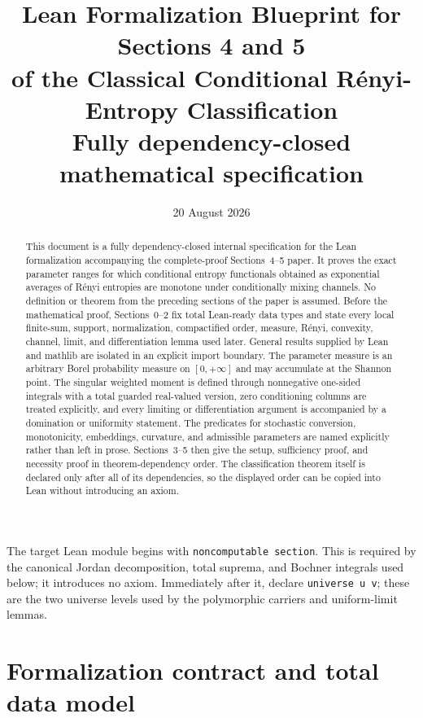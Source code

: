 \documentclass[9pt]{extarticle}
\title{Lean Formalization Blueprint for Sections 4 and 5\\
of the Classical Conditional R\'enyi-Entropy Classification\\
\large Fully dependency-closed mathematical specification}
\author{}
\date{20 August 2026}
\theoremstyle{definition}
\theoremstyle{remark}
\begin{document}
\maketitle

\begin{abstract}
This document is a fully dependency-closed internal specification for the Lean
formalization accompanying the complete-proof Sections~4--5 paper.  It proves the exact parameter
ranges for which conditional entropy functionals obtained as exponential
averages of R\'enyi entropies are monotone under conditionally mixing
channels.  No definition or theorem from the preceding sections of the paper
is assumed.  Before the mathematical proof, Sections~0--2 fix total Lean-ready
data types and state every local finite-sum, support, normalization, compactified
order, measure, R\'enyi, convexity, channel, limit, and differentiation lemma
used later.  General results supplied by Lean and mathlib are isolated in an
explicit import boundary.  The parameter measure is an arbitrary Borel
probability measure on $[0,+\infty]$ and may accumulate at the Shannon point.
The singular weighted moment is defined through nonnegative one-sided
integrals with a total guarded real-valued version, zero conditioning columns
are treated explicitly, and every
limiting or differentiation argument is accompanied by a domination or
uniformity statement.  The predicates for stochastic conversion,
monotonicity, embeddings, curvature, and admissible parameters are named
explicitly rather than left in prose.  Sections~3--5 then give the setup,
sufficiency proof, and necessity proof in theorem-dependency order.  The
classification theorem itself is declared only after all of its dependencies,
so the displayed order can be copied into Lean without introducing an axiom.
\end{abstract}

\tableofcontents

The target Lean module begins with \texttt{noncomputable section}.  This is
required by the canonical Jordan decomposition, total suprema, and Bochner
integrals used below; it introduces no axiom.
Immediately after it, declare \texttt{universe u v}; these are the two
universe levels used by the polymorphic carriers and uniform-limit lemmas.

\setcounter{section}{-1}
\section{Formalization contract and total data model}
\label{sec:formalization-contract}
\end{document}
